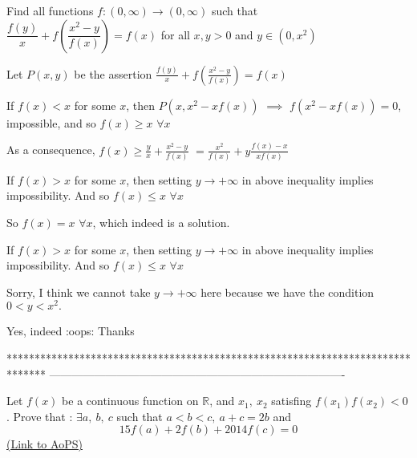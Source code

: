 \begin{solution}
	\begin{tcolorbox}Find all functions $f: (0,\infty) \to (0,\infty)$ such that $ \dfrac {f (y)}{x}+f \left (\dfrac {x^2-y}{f (x)}\right )=f (x)$ for all $x,y>0$ and  $y\in (0,x^2)$\end{tcolorbox}
Let $P(x,y)$ be the assertion $\frac{f(y)}x+f\left(\frac{x^2-y}{f(x)}\right)=f(x)$

If $f(x)<x$ for some $x$, then $P(x,x^2-xf(x))$ $\implies$ $f(x^2-xf(x))=0$, impossible, and so $f(x)\ge x$ $\forall x$

As a consequence, $f(x)\ge\frac yx+\frac{x^2-y}{f(x)}$ $=\frac{x^2}{f(x)}+y\frac{f(x)-x}{xf(x)}$

If $f(x)>x$ for some $x$, then setting $y\to+\infty$ in above inequality implies impossibility. And so $f(x)\le x$ $\forall x$

So $\boxed{f(x)=x}$ $\forall x$, which indeed is a solution.
\end{solution}



\begin{solution}
	\begin{tcolorbox}If $f(x)>x$ for some $x$, then setting $y\to+\infty$ in above inequality implies impossibility. And so $f(x)\le x$ $\forall x$\end{tcolorbox}
Sorry, I think we cannot take $y \to +\infty$ here because we have the condition $0<y<x^2.$
\end{solution}



\begin{solution}
	Yes, indeed :oops:
Thanks
\end{solution}
*******************************************************************************
-------------------------------------------------------------------------------

\begin{problem}
	Let $f(x)$ be a continuous function on $\mathbb{R}$, and $x_1, \: x_2$ satisfing  $f(x_1)f(x_2)<0$. Prove that :  $\exists a,\: b,\: c$ such that $a<b<c,\: a+c=2b$ and 
\[15f(a)+2f(b)+2014f( c)=0\]
	\flushright \href{https://artofproblemsolving.com/community/c6h576484}{(Link to AoPS)}
\end{problem}



